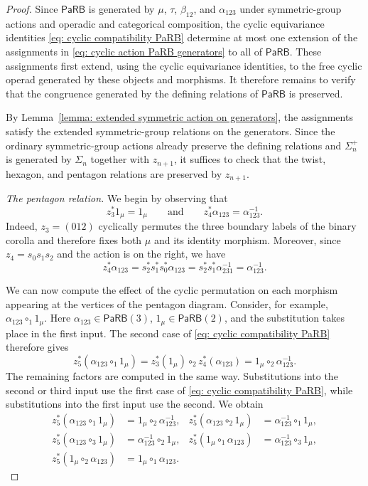 \documentclass{amsart}
\newcommand{\PaRB}{\mathsf{PaRB}}
\newcommand{\twist}{\tau}
\theoremstyle{definition}
\numberwithin{equation}{section}
\begin{document}
\begin{proof}
Since $\PaRB$ is generated by $\mu$, $\twist$, $\beta_{12}$, and
$\alpha_{123}$ under symmetric-group actions and operadic and
categorical composition, the cyclic equivariance identities
\eqref{eq: cyclic compatibility PaRB} determine at most one extension
of the assignments in \eqref{eq: cyclic action PaRB generators} to
all of $\PaRB$. These assignments first extend, using the cyclic
equivariance identities, to the free cyclic operad generated by these
objects and morphisms. It therefore remains to verify that the
congruence generated by the defining relations of $\PaRB$ is
preserved.

By Lemma~\ref{lemma: extended symmetric action on generators}, the
assignments satisfy the extended symmetric-group relations on the
generators. Since the ordinary symmetric-group actions already
preserve the defining relations and $\Sigma_n^+$ is generated by
$\Sigma_n$ together with $z_{n+1}$, it suffices to check that the
twist, hexagon, and pentagon relations are preserved by $z_{n+1}$.


\smallskip
\noindent\emph{The pentagon relation.}
We begin by observing that
\[
z_3^*1_\mu=1_\mu
\qquad\text{and}\qquad
z_4^*\alpha_{123}=\alpha_{123}^{-1}.
\]
Indeed, $z_3=(012)$ cyclically permutes the three boundary labels of
the binary corolla and therefore fixes both $\mu$ and its identity
morphism. Moreover, since $z_4=s_0s_1s_2$ and the action is on the
right, we have
\[
z_4^*\alpha_{123}
=
s_2^*s_1^*s_0^*\alpha_{123}
=
s_2^*s_1^*\alpha_{231}^{-1}
=
\alpha_{123}^{-1}.
\]

We can now compute the effect of the cyclic permutation on each morphism appearing at the vertices of the pentagon diagram. Consider, for example,
$\alpha_{123}\circ_1 1_\mu$. Here $\alpha_{123}\in\PaRB(3)$, $1_\mu\in\PaRB(2)$, and the substitution takes place in the first input. The second case of \eqref{eq: cyclic compatibility PaRB} therefore gives \[z_5^*(\alpha_{123}\circ_1 1_\mu) = z_3^*(1_\mu)\circ_2z_4^*(\alpha_{123}) = 1_\mu\circ_2\alpha_{123}^{-1}. \] The remaining factors are computed in the same way. Substitutions into the second or third input use the first case of  \eqref{eq: cyclic compatibility PaRB}, while substitutions into the first input use the second. We obtain
\begin{equation}
\label{eq: cyclic action on pentagon factors}
\begin{aligned}
z_5^*(\alpha_{123}\circ_1 1_\mu)
  &=1_\mu\circ_2\alpha_{123}^{-1},
&
z_5^*(\alpha_{123}\circ_2 1_\mu)
  &=\alpha_{123}^{-1}\circ_1 1_\mu,\\
z_5^*(\alpha_{123}\circ_3 1_\mu)
  &=\alpha_{123}^{-1}\circ_2 1_\mu,
&
z_5^*(1_\mu\circ_1\alpha_{123})
  &=\alpha_{123}^{-1}\circ_3 1_\mu,\\
z_5^*(1_\mu\circ_2\alpha_{123})
  &=1_\mu\circ_1\alpha_{123}.
\end{aligned}
\end{equation}


\end{proof}
\end{document}
